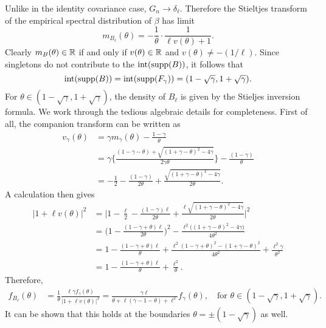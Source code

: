 \documentclass{article}
\newcommand{\interior}{\mathrm{int}}
\begin{document}
Unlike in the identity covariance case, $G_n \to \delta_{\ell}$. Therefore the Stieltjes transform of the empirical spectral distribution of $\beta$ has limit
\begin{equation}
\label{eqn:spiked-covarinace-limiting-stieltjes}
m_{B_{\ell}}(\theta) = -\frac{1}{\theta} \cdot \frac{1}{\ell v(\theta) + 1}. 
\end{equation}
Clearly $m_B(\theta) \in \mathbb{R}$ if and only if $v(\theta) \in \mathbb{R}$ and $v(\theta) \neq -(1/\ell)$. Since singletons do not contribute to the $\interior(\supp(B))$, it follows that 
$$
\interior(\supp(B)) = \interior(\supp(F_\gamma)) = (1 - \sqrt{\gamma}, 1 + \sqrt{\gamma}).
$$
For $\theta \in (1 - \sqrt{\gamma}, 1 + \sqrt{\gamma})$, the density of $B_{\ell}$ is given by the Stieljes inversion formula. We work through the tedious algebraic details for completeness. First of all, the companion transform can be written as 
\begin{align*}
v_{\gamma}(\theta) 
& = \gamma m_{\gamma}(\theta) - \frac{1 - \gamma}{\theta} \\
& = \gamma \bigg\{\frac{(1 - \gamma - \theta) + \sqrt{(1 + \gamma - \theta)^2 - 4 \gamma}}{2 \gamma \theta}\bigg\}- \frac{(1 - \gamma)}{\theta} \\
& = -\frac{1}{2} - \frac{(1 - \gamma)}{2 \theta} + \frac{\sqrt{(1 + \gamma - \theta)^2 - 4 \gamma}}{2\theta}.
\end{align*}
A calculation then gives
\begin{align*}
|1 + \ell v(\theta)|^2 
& = 
\bigg|1 - \frac{\ell}{2} - \frac{(1 - \gamma)\ell}{2 \theta} + \frac{\ell\sqrt{(1 + \gamma - \theta)^2 - 4 \gamma}}{2\theta}\bigg|^2 \\
& = 
\bigg(1 - \frac{(1 - \gamma + \theta)\ell}{2 \theta}\bigg)^2 - \frac{\ell^2\Big((1 + \gamma - \theta)^2 - 4 \gamma\Big)}{4\theta^2} \\
& = 
1 - \frac{(1 - \gamma + \theta)\ell}{ \theta} + \frac{\ell^2(1 - \gamma + \theta)^2- (1 + \gamma - \theta)^2}{4\theta^2} + \frac{\ell^2\gamma}{\theta^2} \\
& = 1 - \frac{(1 - \gamma + \theta)\ell}{ \theta} + \frac{\ell^2}{\theta}. 
\end{align*}
Therefore, 
\begin{align*}
f_{B_{\ell}}(\theta) & = \frac{1}{\theta} \frac{\ell \gamma f_{\gamma}(\theta)}{|1 + \ell v(\theta)|^2}  = \frac{\gamma \ell}{\theta + \ell(\gamma - 1 - \theta) + \ell^2} f_{\gamma}(\theta), \quad \textrm{for $\theta \in (1 - \sqrt{\gamma}, 1 + \sqrt{\gamma}).$}
\end{align*}
It can be shown that this holds at the boundaries $\theta = \pm(1 - \sqrt{\gamma})$ as well.
\end{document}
